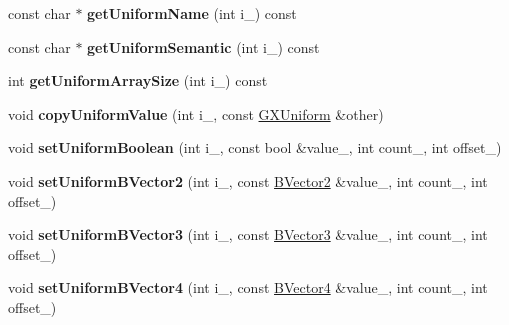 \begin{DoxyCompactItemize}
\item 
const char $\ast$ {\bfseries get\+Uniform\+Name} (int i\+\_\+) const \hypertarget{class_magnum_1_1_g_x_shader_program2_a454b126f5daf9bd97fc3822991a1c6d6}{}\label{class_magnum_1_1_g_x_shader_program2_a454b126f5daf9bd97fc3822991a1c6d6}

\item 
const char $\ast$ {\bfseries get\+Uniform\+Semantic} (int i\+\_\+) const \hypertarget{class_magnum_1_1_g_x_shader_program2_a09f04f84642a99ff74c3b457cc0fab1e}{}\label{class_magnum_1_1_g_x_shader_program2_a09f04f84642a99ff74c3b457cc0fab1e}

\item 
int {\bfseries get\+Uniform\+Array\+Size} (int i\+\_\+) const \hypertarget{class_magnum_1_1_g_x_shader_program2_a3db9a9520270ee52fe5b08880e5b2783}{}\label{class_magnum_1_1_g_x_shader_program2_a3db9a9520270ee52fe5b08880e5b2783}

\item 
void {\bfseries copy\+Uniform\+Value} (int i\+\_\+, const \hyperlink{class_i_dream_sky_1_1_g_x_uniform}{G\+X\+Uniform} \&other)\hypertarget{class_magnum_1_1_g_x_shader_program2_a41e9adc30cd80f6078dae37432dca3cd}{}\label{class_magnum_1_1_g_x_shader_program2_a41e9adc30cd80f6078dae37432dca3cd}

\item 
void {\bfseries set\+Uniform\+Boolean} (int i\+\_\+, const bool \&value\+\_\+, int count\+\_, int offset\+\_)\hypertarget{class_magnum_1_1_g_x_shader_program2_a79ff596d4623b971a9d260c608daca38}{}\label{class_magnum_1_1_g_x_shader_program2_a79ff596d4623b971a9d260c608daca38}

\item 
void {\bfseries set\+Uniform\+B\+Vector2} (int i\+\_\+, const \hyperlink{class_i_dream_sky_1_1_b_vector2}{B\+Vector2} \&value\+\_\+, int count\+\_, int offset\+\_)\hypertarget{class_magnum_1_1_g_x_shader_program2_a508da92a42ae3e1e6503eaf4f585b0a1}{}\label{class_magnum_1_1_g_x_shader_program2_a508da92a42ae3e1e6503eaf4f585b0a1}

\item 
void {\bfseries set\+Uniform\+B\+Vector3} (int i\+\_\+, const \hyperlink{class_i_dream_sky_1_1_b_vector3}{B\+Vector3} \&value\+\_\+, int count\+\_, int offset\+\_)\hypertarget{class_magnum_1_1_g_x_shader_program2_a16ca807f486fce319ce7010ac2d80d01}{}\label{class_magnum_1_1_g_x_shader_program2_a16ca807f486fce319ce7010ac2d80d01}

\item 
void {\bfseries set\+Uniform\+B\+Vector4} (int i\+\_\+, const \hyperlink{class_i_dream_sky_1_1_b_vector4}{B\+Vector4} \&value\+\_\+, int count\+\_, int offset\+\_)\hypertarget{class_magnum_1_1_g_x_shader_program2_a02312c7209cc7363a404ce7b255c85bb}{}\label{class_magnum_1_1_g_x_shader_program2_a02312c7209cc7363a404ce7b255c85bb}


\end{DoxyCompactItemize}
